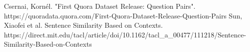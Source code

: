 \documentclass{article}
\begin{document}
\begin{footnotesize}


Csernai, Kornél. "First Quora Dataset Release: Question Pairs". https://quoradata.quora.com/First-Quora-Dataset-Release-Question-Pairs
\newline
Sun, Xiaofei et al. Sentence Similarity Based on Contexts. https://direct.mit.edu/tacl/article/doi/10.1162/tacl\_a\_00477/111218/Sentence-Similarity-Based-on-Contexts
\end{footnotesize}%
\end{document}
